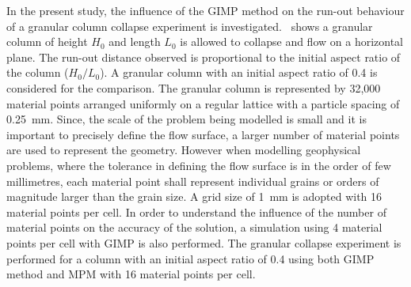 In the present study, the influence of the GIMP method on the run-out behaviour 
of a granular column collapse experiment is investigated.~ shows 
a granular column of height $H_0$ and length $L_0$ is allowed to collapse and 
flow on a horizontal plane. The run-out distance observed is proportional to 
the initial aspect ratio of the column ($H_0/L_0$). A granular column with an 
initial aspect ratio of 0.4 is considered for the comparison. The granular 
column is represented by 32,000 material points arranged uniformly on a regular 
lattice with a particle spacing of 0.25~\si{\mm}. Since, the scale of the 
problem being modelled is small and it is important to precisely define the 
flow surface, a larger number of material points are used to represent the 
geometry. However when modelling geophysical problems, where the tolerance in 
defining the flow surface is in the order of few millimetres, each material 
point shall represent individual grains or orders of magnitude larger than the 
grain size. A grid size of 1~\si{mm} is adopted with 16 material points per 
cell. In order to understand the influence of the number of material points on 
the accuracy of the solution, a simulation using 4 material points per cell 
with GIMP is also performed. The granular collapse experiment is performed for 
a column with an initial aspect ratio of 0.4 using both GIMP method and MPM 
with 16 material points per cell. 

